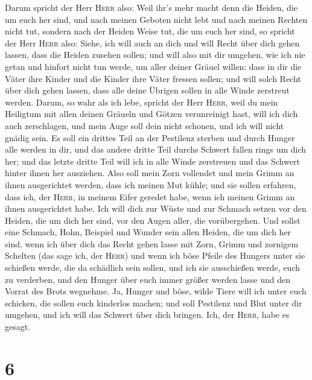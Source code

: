  Darum spricht der Herr \textsc{Herr} also: Weil ihr's
mehr macht denn die Heiden, die um euch her sind, und nach meinen
Geboten nicht lebt und nach meinen Rechten nicht tut, sondern nach der
Heiden Weise tut, die um euch her sind,  so spricht der
Herr \textsc{Herr} also: Siehe, ich will auch an dich und will Recht
über dich gehen lassen, dass die Heiden zusehen sollen; 
und will also mit dir umgehen, wie ich nie getan und hinfort nicht tun
werde, um aller deiner Gräuel willen:  dass in dir die
Väter ihre Kinder und die Kinder ihre Väter fressen sollen; und will
solch Recht über dich gehen lassen, dass alle deine Übrigen sollen in
alle Winde zerstreut werden.  Darum, so wahr als ich
lebe, spricht der Herr \textsc{Herr}, weil du mein Heiligtum mit allen
deinen Gräueln und Götzen verunreinigt hast, will ich dich auch
zerschlagen, und mein Auge soll dein nicht schonen, und ich will nicht
gnädig sein.  Es soll ein drittes Teil an der Pestilenz
sterben und durch Hunger alle werden in dir, und das andere dritte Teil
durchs Schwert fallen rings um dich her; und das letzte dritte Teil will
ich in alle Winde zerstreuen und das Schwert hinter ihnen her ausziehen.
 Also soll mein Zorn vollendet und mein Grimm an ihnen
ausgerichtet werden, dass ich meinen Mut kühle; und sie sollen erfahren,
dass ich, der \textsc{Herr}, in meinem Eifer geredet habe, wenn ich
meinen Grimm an ihnen ausgerichtet habe.  Ich will dich
zur Wüste und zur Schmach setzen vor den Heiden, die um dich her sind,
vor den Augen aller, die vorübergehen.  Und sollst eine
Schmach, Hohn, Beispiel und Wunder sein allen Heiden, die um dich her
sind, wenn ich über dich das Recht gehen lasse mit Zorn, Grimm und
zornigem Schelten (das sage ich, der \textsc{Herr})  und
wenn ich böse Pfeile des Hungers unter sie schießen werde, die da
schädlich sein sollen, und ich sie ausschießen werde, euch zu verderben,
und den Hunger über euch immer größer werden lasse und den Vorrat des
Brots wegnehme.  Ja, Hunger und böse, wilde Tiere will
ich unter euch schicken, die sollen euch kinderlos machen; und soll
Pestilenz und Blut unter dir umgehen, und ich will das Schwert über dich
bringen. Ich, der \textsc{Herr}, habe es gesagt.

\hypertarget{section-5}{%
\section{6}\label{section-5}}

